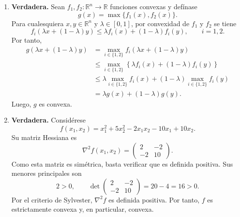 \begin{enumerate}
    \item \textbf{Verdadera.} Sean $f_1,f_2:\mathbb{R}^n\to\mathbb{R}$ funciones convexas y defínase
    \[
        g(x)=\max\{f_1(x),f_2(x)\}.
    \]
    Para cualesquiera $x,y\in\mathbb{R}^n$ y $\lambda\in[0,1]$, por convexidad de $f_1$ y $f_2$ se tiene
    \[
        f_i(\lambda x+(1-\lambda)y)
        \leq \lambda f_i(x)+(1-\lambda)f_i(y),
        \qquad i=1,2.
    \]
    Por tanto,
    \begin{align*}
        g(\lambda x+(1-\lambda)y)
        &=\max_{i\in\{1,2\}} f_i(\lambda x+(1-\lambda)y)\\
        &\leq \max_{i\in\{1,2\}}
        \left\{\lambda f_i(x)+(1-\lambda)f_i(y)\right\}\\
        &\leq \lambda \max_{i\in\{1,2\}} f_i(x)
        +(1-\lambda)\max_{i\in\{1,2\}}f_i(y)\\
        &=\lambda g(x)+(1-\lambda)g(y).
    \end{align*}
    Luego, $g$ es convexa.

    \item \textbf{Verdadera.} Considérese
    \[
        f(x_1,x_2)=x_1^2+5x_2^2-2x_1x_2-10x_1+10x_2.
    \]
    Su matriz Hessiana es
    \[
        \nabla^2 f(x_1,x_2)=
        \begin{pmatrix}
            2 & -2\\
            -2 & 10
        \end{pmatrix}.
    \]
    Como esta matriz es simétrica, basta verificar que es definida positiva. Sus menores principales son
    \[
        2>0,
        \qquad
        \det\begin{pmatrix}
            2 & -2\\
            -2 & 10
        \end{pmatrix}
        =20-4=16>0.
    \]
    Por el criterio de Sylvester, $\nabla^2 f$ es definida positiva. Por tanto, $f$ es estrictamente convexa y, en particular, convexa.
\end{enumerate}
